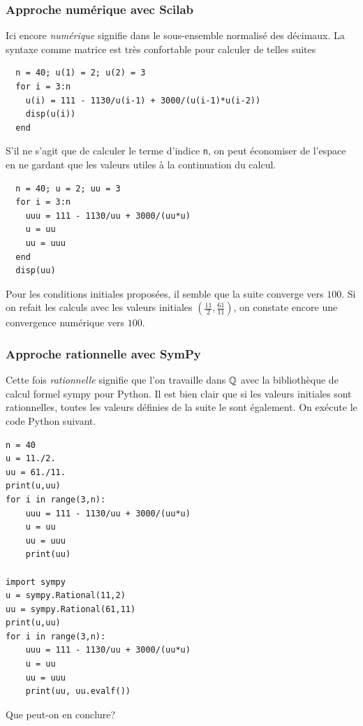 \subsubsection{Approche numérique avec Scilab}
Ici encore \emph{numérique} signifie dans le sous-ensemble normalisé des décimaux. La syntaxe comme matrice est très confortable pour calculer de telles suites
\begin{verbatim}
  n = 40; u(1) = 2; u(2) = 3
  for i = 3:n
    u(i) = 111 - 1130/u(i-1) + 3000/(u(i-1)*u(i-2))
    disp(u(i))
  end
\end{verbatim}
S'il ne s'agit que de calculer le terme d'indice \texttt{n}, on peut économiser de l'espace en ne gardant que les valeurs utiles à la continuation du calcul.
\begin{verbatim}
  n = 40; u = 2; uu = 3
  for i = 3:n
    uuu = 111 - 1130/uu + 3000/(uu*u)
    u = uu
    uu = uuu
  end
  disp(uu)
\end{verbatim}
Pour les conditions initiales proposées, il semble que la suite converge vers $100$. Si on refait les calculs avec les valeurs initiales $(\frac{11}{2},\frac{61}{11})$, on constate encore une convergence numérique vers $100$.

\subsubsection{Approche rationnelle avec SymPy}
Cette fois \emph{rationnelle} signifie que l'on travaille dans $\mathbb{Q}$ avec la bibliothèque de calcul formel sympy pour Python. Il est bien clair que si les valeurs initiales sont rationnelles, toutes les valeurs définies de la suite le sont également. On exécute le code Python suivant. 
\begin{verbatim}
n = 40
u = 11./2.
uu = 61./11.
print(u,uu)
for i in range(3,n):
    uuu = 111 - 1130/uu + 3000/(uu*u)
    u = uu
    uu = uuu
    print(uu)

import sympy
u = sympy.Rational(11,2)
uu = sympy.Rational(61,11)
print(u,uu)
for i in range(3,n):
    uuu = 111 - 1130/uu + 3000/(uu*u)
    u = uu
    uu = uuu
    print(uu, uu.evalf())  
\end{verbatim}
Que peut-on en conclure?
